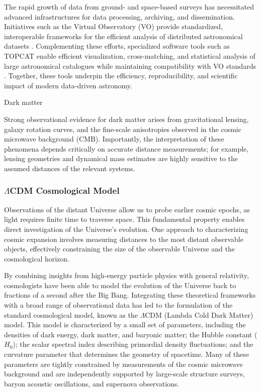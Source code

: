 The rapid growth of data from ground- and space-based surveys has necessitated advanced infrastructures for data processing, archiving, and dissemination. Initiatives such as the Virtual Observatory (VO) provide standardized, interoperable frameworks for the efficient analysis of distributed astronomical datasets \citep{2009hatziminaoglou}. Complementing these efforts, specialized software tools such as TOPCAT enable efficient visualization, cross-matching, and statistical analysis of large astronomical catalogues while maintaining compatibility with VO standards \citep{2005TOPCAT}. Together, these tools underpin the efficiency, reproducibility, and scientific impact of modern data-driven astronomy.


Dark matter

Strong observational evidence for dark matter arises from gravitational lensing, galaxy rotation curves, and the fine-scale anisotropies observed in the cosmic microwave background (CMB). Importantly, the interpretation of these phenomena depends critically on accurate distance measurements; for example, lensing geometries and dynamical mass estimates are highly sensitive to the assumed distances of the relevant systems. 


\subsubsection{$\Lambda$CDM Cosmological Model}

Observations of the distant Universe allow us to probe earlier cosmic epochs, as light requires finite time to traverse space. This fundamental property enables direct investigation of the Universe’s evolution. One approach to characterizing cosmic expansion involves measuring distances to the most distant observable objects, effectively constraining the size of the observable Universe and the cosmological horizon.

By combining insights from high-energy particle physics with general relativity, cosmologists have been able to model the evolution of the Universe back to fractions of a second after the Big Bang. Integrating these theoretical frameworks with a broad range of observational data has led to the formulation of the standard cosmological model, known as the $\Lambda$CDM (Lambda Cold Dark Matter) model. This model is characterized by a small set of parameters, including the densities of dark energy, dark matter, and baryonic matter; the Hubble constant ($H_0$); the scalar spectral index describing primordial density fluctuations; and the curvature parameter that determines the geometry of spacetime. Many of these parameters are tightly constrained by measurements of the cosmic microwave background and are independently supported by large-scale structure surveys, baryon acoustic oscillations, and supernova observations.

